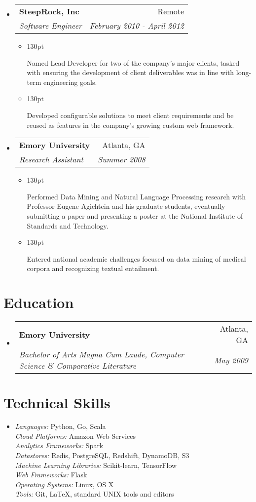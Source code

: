 \documentclass[letterpaper,10pt]{article}
\makeatletter
\newcommand{\resumeItem}[1]{
  \item{
    \begin{adjustwidth}{}{130pt}
    #1
    \end{adjustwidth}
  }
}
\newcommand{\resumeSubheading}[4]{
  \vspace{-1pt}\item[]
    \begin{tabular*}{0.97\textwidth}{l@{\extracolsep{\fill}}r}
      \textbf{#1} & #2 \\
      \textit{#3} & \textit{#4} \\
    \end{tabular*}\vspace{-5pt}
}
\makeatother
\begin{document}
\begin{itemize}[leftmargin=*]
    \resumeSubheading
      {SteepRock, Inc}
      {Remote}
      {Software Engineer}
      {February 2010 - April 2012}
    \begin{itemize}
      \resumeItem{
        Named Lead Developer for two of the company's major
        clients, tasked with ensuring the development of client
        deliverables was in line with long-term engineering goals.
      }
      \resumeItem{
        Developed configurable solutions to meet client
        requirements and be reused as features in the company's
        growing custom web framework.
      }
    \end{itemize}

    \resumeSubheading
      {Emory University}
      {Atlanta, GA}
      {Research Assistant}
      {Summer 2008}
    \begin{itemize}
      \resumeItem{
        Performed Data Mining and Natural Language Processing research
        with Professor Eugene Agichtein and his graduate students,
        eventually submitting a paper and presenting a poster at the National
        Institute of Standards and Technology.
      }
      \resumeItem{
        Entered national academic challenges focused on data
        mining of medical corpora and recognizing textual entailment.
      }
    \end{itemize}

  \end{itemize}

\section{Education}
  \begin{itemize}[leftmargin=*]
    \resumeSubheading
        {Emory University}
        {Atlanta, GA}
        {Bachelor of Arts Magna Cum Laude, Computer Science \& Comparative Literature}
        {May 2009}
  \end{itemize}

\section{Technical Skills}
  \begin{itemize}[leftmargin=*]
  \item[]
    \textit{Languages:} Python, Go, Scala \\
    \textit{Cloud Platforms:} Amazon Web Services\\
    \textit{Analytics Frameworks:} Spark \\
    \textit{Datastores:} Redis, PostgreSQL, Redshift, DynamoDB, S3 \\
    \textit{Machine Learning Libraries:} Scikit-learn, TensorFlow  \\
    \textit{Web Frameworks:} Flask \\
    \textit{Operating Systems:} Linux, OS X\\
    \textit{Tools:} Git, \LaTeX, standard UNIX tools and editors
  \end{itemize}
\end{document}
